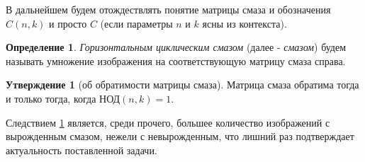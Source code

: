 \documentclass[a4paper]{article}
\theoremstyle{definition}
\newtheorem{statement}{Утверждение}[section]
\newtheorem{definition}{Определение}[section]
\begin{document}
    В дальнейшем будем отождествлять понятие матрицы смаза и обозначения $C(n, k)$ и просто $C$ (если параметры $n$ и $k$ ясны из контекста).
\vspace{0.3cm}


    \begin{definition}
    \label{blur}
	\emph{Горизонтальным циклическим смазом} (далее - \emph{смазом}) будем называть умножение изображения на соответствующую матрицу смаза справа.
    \end{definition}


    \begin{statement}[об обратимости матрицы смаза]
    \label{inverse}
	Матрица смаза обратима тогда и только тогда, когда НОД$(n, k) = 1$.
    \end{statement}


    Следствием \ref{inverse} является, среди прочего, большее количество изображений с вырожденным смазом, нежели с невырожденным, что лишний раз подтверждает актуальность поставленной задачи.

\newpage
\end{document}
